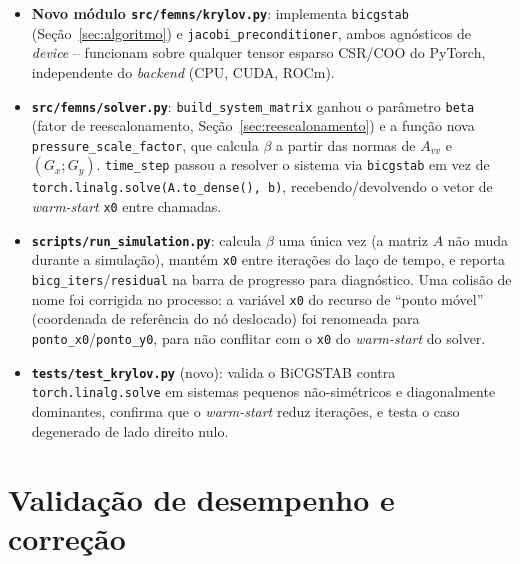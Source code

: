 \documentclass[11pt,a4paper]{article}
\begin{document}
\begin{itemize}
  \item \textbf{Novo módulo \texttt{src/femns/krylov.py}}: implementa
    \texttt{bicgstab} (Seção~\ref{sec:algoritmo}) e
    \texttt{jacobi\_preconditioner}, ambos agnósticos de \emph{device}
    -- funcionam sobre qualquer tensor esparso CSR/COO do PyTorch,
    independente do \emph{backend} (CPU, CUDA, ROCm).

  \item \textbf{\texttt{src/femns/solver.py}}: \texttt{build\_system\_matrix}
    ganhou o parâmetro \texttt{beta} (fator de reescalonamento,
    Seção~\ref{sec:reescalonamento}) e a função nova
    \texttt{pressure\_scale\_factor}, que calcula $\beta$ a partir das
    normas de $A_{vv}$ e $(G_x;G_y)$. \texttt{time\_step} passou a
    resolver o sistema via \texttt{bicgstab} em vez de
    \texttt{torch.linalg.solve(A.to\_dense(), b)}, recebendo/devolvendo
    o vetor de \emph{warm-start} \texttt{x0} entre chamadas.

  \item \textbf{\texttt{scripts/run\_simulation.py}}: calcula $\beta$
    uma única vez (a matriz $A$ não muda durante a simulação), mantém
    \texttt{x0} entre iterações do laço de tempo, e reporta
    \texttt{bicg\_iters}/\texttt{residual} na barra de progresso para
    diagnóstico. Uma colisão de nome foi corrigida no processo: a
    variável \texttt{x0} do recurso de ``ponto móvel'' (coordenada de
    referência do nó deslocado) foi renomeada para
    \texttt{ponto\_x0}/\texttt{ponto\_y0}, para não conflitar com o
    \texttt{x0} do \emph{warm-start} do solver.

  \item \textbf{\texttt{tests/test\_krylov.py}} (novo): valida o
    BiCGSTAB contra \texttt{torch.linalg.solve} em sistemas pequenos
    não-simétricos e diagonalmente dominantes, confirma que o
    \emph{warm-start} reduz iterações, e testa o caso degenerado de
    lado direito nulo.
\end{itemize}

\section{Validação de desempenho e correção}
\end{document}

